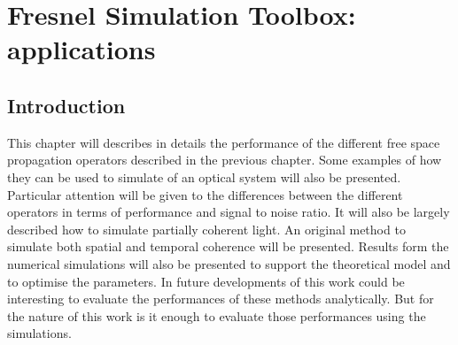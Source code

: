 \chapter{Fresnel Simulation Toolbox: applications}
\label{chap:fresnel2}
\section{Introduction}
This chapter will describes in details the performance of the different free space propagation operators described in the previous chapter. Some examples of how they can be used to simulate of an optical system will also be presented. Particular attention will be given to the differences between the different operators in terms of performance and signal to noise ratio.
It will also be largely described how to simulate partially coherent light. An original method to simulate both spatial and temporal coherence will be presented. Results form the numerical simulations will also be presented to support the theoretical model and to optimise the parameters.
In future developments of this work could be interesting to evaluate the performances of these methods analytically. But for the nature of this work is it enough to evaluate those performances using the simulations.
